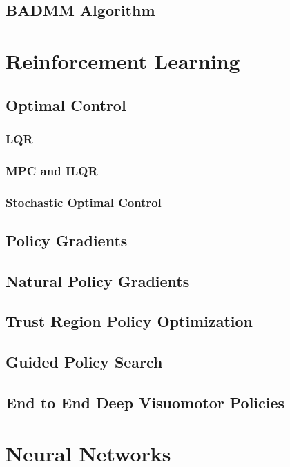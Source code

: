 \documentclass[12pt]{article}
\begin{document}
\subsection{BADMM Algorithm}

\section{Reinforcement Learning}

\subsection{Optimal Control}

\subsubsection{LQR}

\subsubsection{MPC and ILQR}

\subsubsection{Stochastic Optimal Control}

\subsection{Policy Gradients}

\subsection{Natural Policy Gradients}

\subsection{Trust Region Policy Optimization}

\subsection{Guided Policy Search}

\subsection{End to End Deep Visuomotor Policies}

\section{Neural Networks}
\end{document}
